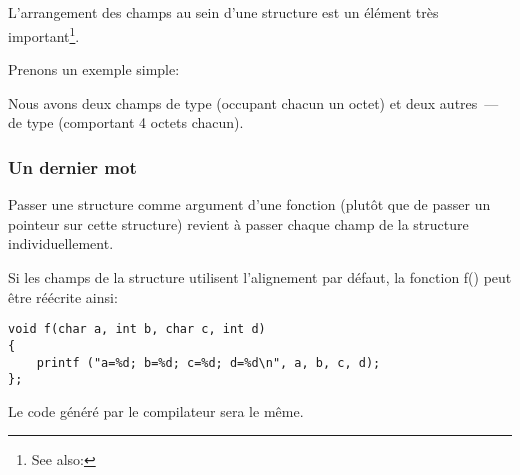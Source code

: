 ﻿\subsection{\StructurePackingSectionName}
\label{structure_packing}


L'arrangement des champs au sein d'une structure est un élément très important\footnote{See also: \URLWPDA}.

Prenons un exemple simple:



Nous avons deux champs de type \Tchar (occupant chacun un octet) et deux autres~---de type \Tint (comportant 4 octets chacun).





\subsubsection{Un dernier mot}

Passer une structure comme argument d'une fonction (plutôt que de passer un pointeur sur cette structure) 
revient à passer chaque champ de la structure individuellement.

Si les champs de la structure utilisent l'alignement par défaut, la fonction f() peut être réécrite ainsi:

\begin{lstlisting}[style=customc]
void f(char a, int b, char c, int d)
{
    printf ("a=%d; b=%d; c=%d; d=%d\n", a, b, c, d);
};
\end{lstlisting}

Le code généré par le compilateur sera le même.
